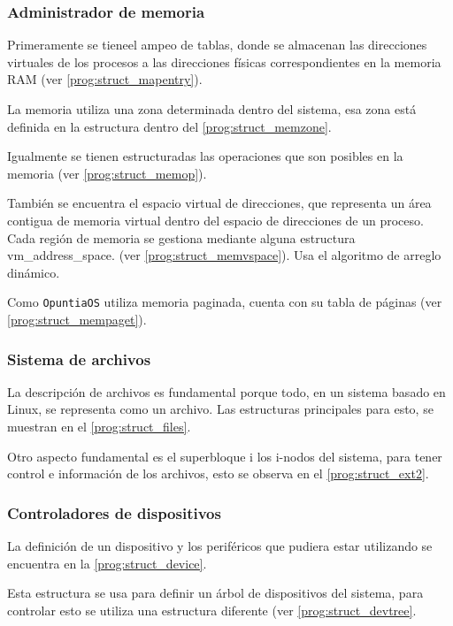 	
	
	\subsubsection{Administrador de memoria}
		Primeramente se tieneel ampeo de tablas, donde se almacenan las direcciones virtuales de los procesos a las direcciones físicas correspondientes en la memoria RAM (ver \autoref{prog:struct_mapentry}).
		
		La memoria utiliza una zona determinada dentro del sistema, esa zona está definida en la estructura dentro del \autoref{prog:struct_memzone}.
		
		Igualmente se tienen estructuradas las operaciones que son posibles en la memoria (ver \autoref{prog:struct_memop}).
		
		También se encuentra el espacio virtual de direcciones, que representa un área contigua de memoria virtual dentro del espacio de direcciones de un proceso. Cada región de memoria se gestiona mediante alguna estructura vm\_address\_space. (ver \autoref{prog:struct_memvspace}). Usa el algoritmo de arreglo dinámico.
		
		Como \texttt{OpuntiaOS} utiliza memoria paginada, cuenta con su tabla de páginas  (ver \autoref{prog:struct_mempaget}).
		
		
		
	\subsubsection{Sistema de archivos}
		La descripción de archivos es fundamental porque todo, en un sistema basado en Linux, se representa como un archivo. Las estructuras principales para esto, se muestran en el \autoref{prog:struct_files}.
		
		Otro aspecto fundamental es el superbloque i los i-nodos del sistema, para tener control e información de los archivos, esto se observa en el \autoref{prog:struct_ext2}.
		
		
		
	
	\subsubsection{Controladores de dispositivos}
		La definición de un dispositivo y los periféricos que pudiera estar utilizando se encuentra en la  \autoref{prog:struct_device}.
		
		Esta estructura se usa para definir un árbol de dispositivos del sistema, para controlar esto se utiliza una estructura diferente (ver \autoref{prog:struct_devtree}.
		
	
	

	
	